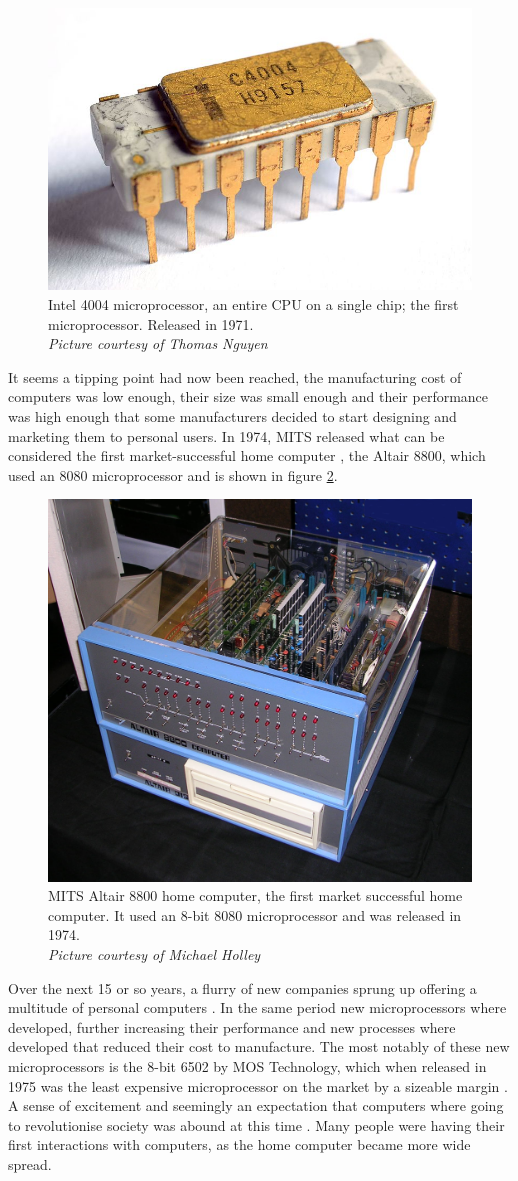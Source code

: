 \begin{figure} \begin{center}
\includegraphics[width=.3\linewidth]{pics/intel_4004} 
\end{center} 
\caption{Intel 4004 microprocessor, an entire CPU on a single chip; the first microprocessor. Released in 1971.\\ \textit{\small{Picture courtesy of Thomas Nguyen}}}
\label{Intel4004}
\end{figure} 

It seems a tipping point had now been reached, the manufacturing cost of computers was low enough, their size was small enough and their performance was high enough that some manufacturers decided to start designing and marketing them to personal users. In 1974, MITS released what can be considered the first market-successful home computer 
\cite{RN41}, the Altair 8800, which used an 8080 microprocessor and is shown in figure \ref{Altair8800}.

\begin{figure} \begin{center}
\includegraphics[width=.3\linewidth]{pics/altair_8800_computer} 
\end{center} 
\caption{MITS Altair 8800 home computer, the first market successful home computer. It used an 8-bit 8080 microprocessor and was released in 1974.\\ \textit{\small{Picture courtesy of Michael Holley}}}
\label{Altair8800}
\end{figure}

Over the next 15 or so years, a flurry of new companies sprung up offering a multitude of personal computers 
\cite{RN27}. In the same period new microprocessors where developed, further increasing their performance and new processes where developed that reduced their cost to manufacture. The most notably of these new microprocessors is the 8-bit 6502 by MOS Technology, which when released in 1975 was the least expensive microprocessor on the market by a sizeable margin 
\cite{RN40}. A sense of excitement and seemingly an expectation that computers where going to revolutionise society was abound at this time 
\cite{RN34}. Many people were having their first interactions with computers, as the home computer became more wide spread.

